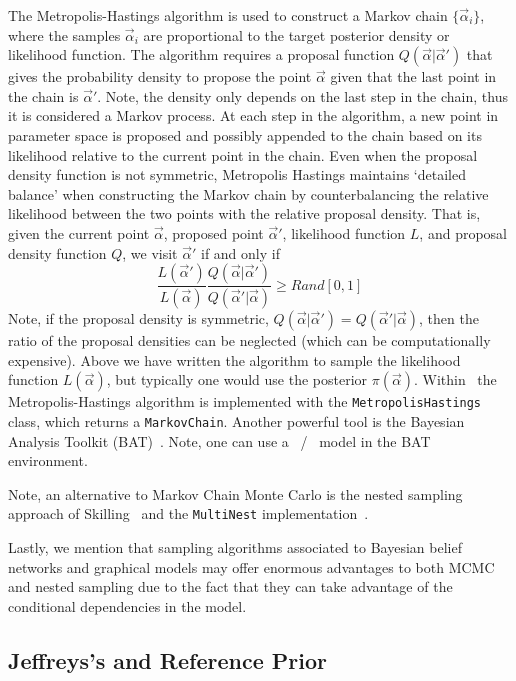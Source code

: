 	The Metropolis-Hastings algorithm is used to construct a Markov chain $\{\vec\alpha_i\}$, where the samples $\vec\alpha_i$ are proportional to the target posterior density or likelihood function.  The algorithm requires a proposal function $Q(\vec\alpha | \vec\alpha')$ that gives the probability density to propose the point $\vec\alpha$ given that the last point in the chain is $\vec\alpha'$.  Note, the density only depends on the last step in the chain, thus it is considered a Markov process.  At each step in the algorithm, a new point in parameter space is proposed and possibly appended to the chain based on its likelihood relative to the current point in the chain.  Even when the proposal density function is not symmetric, Metropolis Hastings maintains `detailed balance' when constructing the Markov chain by counterbalancing the relative likelihood between the two points with the relative proposal density.  That is, given the current point $\vec\alpha$, proposed point $\vec\alpha'$, likelihood function $L$, and proposal density function $Q$, we visit $\vec\alpha'$ if and only if
\begin{equation}
\displaystyle \frac{L(\vec\alpha')}{L(\vec\alpha)} \frac{Q(\vec\alpha | \vec\alpha')}{Q(\vec\alpha' | \vec\alpha)} \geq Rand[0,1]
\end{equation}
Note, if the proposal density is symmetric, $Q(\vec\alpha | \vec\alpha')=Q(\vec\alpha' | \vec\alpha)$, then the ratio of the proposal densities can be neglected (which can be computationally expensive).  Above we have written the algorithm to sample the likelihood function $L(\vec\alpha)$, but typically one would use the posterior $\pi(\vec\alpha)$. Within \roostats\ the Metropolis-Hastings algorithm is implemented with the \texttt{MetropolisHastings} class, which returns a \texttt{MarkovChain}.  Another powerful tool is the Bayesian Analysis Toolkit (BAT)~\cite{Caldwell:2009ve}.  Note, one can use a \roofit\ / \roostats\ model in the BAT environment.


Note, an alternative to Markov Chain Monte Carlo is the nested sampling approach of Skilling~\cite{skilling:395} and the \texttt{MultiNest} implementation~\cite{Feroz:2008xx}.


Lastly, we mention that sampling algorithms associated to Bayesian belief networks and graphical models may offer enormous advantages to both MCMC and nested sampling due to the fact that they can take advantage of the conditional dependencies in the model.


\subsection{Jeffreys's and Reference Prior}


